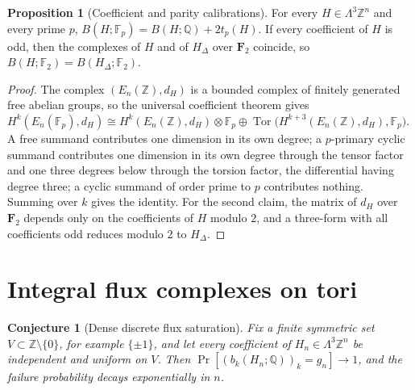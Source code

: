 \documentclass[11pt]{article}
\newtheorem{conjecture}{Conjecture}
\theoremstyle{definition}
\newcommand{\Z}{\mathbb Z}
\providecommand{\Z}{\mathbb Z}
\newtheorem{proposition}{Proposition}
\begin{document}
\begin{proposition}[Coefficient and parity calibrations]\label{aa:uct}
For every $H\in\Lambda^3\Z^n$ and every prime $p$, $B(H;\mathbb F_p)=B(H;\mathbb Q)+2t_p(H)$.  If every coefficient of $H$ is odd, then the complexes of $H$ and of $H_\Delta$ over $\mathbf F_2$ coincide, so $B(H;\mathbb F_2)=B(H_\Delta;\mathbb F_2)$.
\end{proposition}

\begin{proof}
The complex $(E_n(\Z),d_H)$ is a bounded complex of finitely generated free abelian groups, so the universal coefficient theorem gives $H^k(E_n(\mathbb F_p),d_H)\cong H^k(E_n(\Z),d_H)\otimes\mathbb F_p\oplus\operatorname{Tor}\bigl(H^{k+3}(E_n(\Z),d_H),\mathbb F_p\bigr)$.  A free summand contributes one dimension in its own degree; a $p$-primary cyclic summand contributes one dimension in its own degree through the tensor factor and one three degrees below through the torsion factor, the differential having degree three; a cyclic summand of order prime to $p$ contributes nothing.  Summing over $k$ gives the identity.  For the second claim, the matrix of $d_H$ over $\mathbf F_2$ depends only on the coefficients of $H$ modulo $2$, and a three-form with all coefficients odd reduces modulo $2$ to $H_\Delta$.
\end{proof}

\section{Integral flux complexes on tori}

\begin{conjecture}[Dense discrete flux saturation]\label{aa1}
Fix a finite symmetric set $V\subset\Z\setminus\{0\}$, for example $\{\pm1\}$, and let every coefficient of $H_n\in\Lambda^3\Z^n$ be independent and uniform on $V$.  Then $\Pr[(b_k(H_n;\mathbb Q))_k=g_n]\to1$, and the failure probability decays exponentially in $n$.
\end{conjecture}
\end{document}
